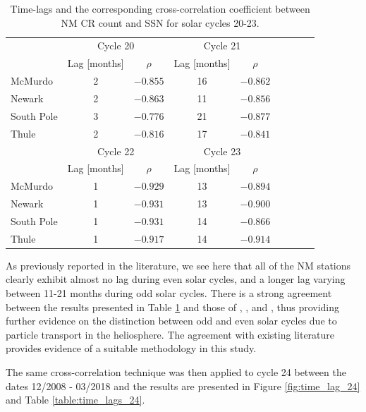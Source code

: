 \begin{table}[!ht]
	\begin{center}
	\caption{Time-lags and the corresponding cross-correlation coefficient between NM CR count and SSN for solar cycles 20-23.}
	\label{table:time_lags_20-23}
	\begin{tabular}{l c c c c c c c c}
		\hline 
		{} & \multicolumn{2}{c}{Cycle 20} & \multicolumn{2}{c}{Cycle 21}  \\
		{} & {Lag [months]} & {$\rho$} & {Lag [months]} & {$\rho$} \\ \hline
		{McMurdo} & {2} & {$-0.855$} & {16} & {$-0.862$}  \\
		{Newark} & {2} & {$-0.863$} & {11} & {$-0.856$} \\
		{South Pole} & {3} & {$-0.776$} & {21} & {$-0.877$}  \\
		{Thule} & {2} & {$-0.816$} & {17} & {$-0.841$} \\ \hline
		
		{} & \multicolumn{2}{c}{Cycle 22} & \multicolumn{2}{c}{Cycle 23}\\
		{} & {Lag [months]} & {$\rho$} & {Lag [months]} & {$\rho$}\\ \hline
		{McMurdo}  & {1} & {$-0.929$} & {13} & {$-0.894$} \\
		{Newark} & {1} & {$-0.931$} & {13} & {$-0.900$} \\
		{South Pole}  & {1} & {$-0.931$} & {14} & {$-0.866$} \\
		{Thule}  & {1} & {$-0.917$} & {14} & {$-0.914$}\\ \hline
	\end{tabular}
	\end{center}
\end{table}


As previously reported in the literature, we see here that all of the NM stations clearly exhibit almost no lag during even solar cycles, and a longer lag varying between 11-21 months during odd solar cycles. There is a strong agreement between the results presented in Table \ref{table:time_lags_20-23} and those of \cite{mavromichalaki_cosmic-ray_2007}, \cite{kane_lags_2014}, and \cite{paouris_solar_2015-1}, thus providing further evidence on the distinction between odd and even solar cycles due to particle transport in the heliosphere. The agreement with existing literature provides evidence of a suitable methodology in this study.

The same cross-correlation technique was then applied to cycle 24 between the dates 12/2008 - 03/2018 and the results are presented in Figure \ref{fig:time_lag_24} and Table \ref{table:time_lags_24}.

